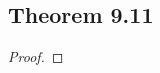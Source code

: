 \documentclass[../../main.tex]{subfiles}
\begin{document}
\subsection{Theorem 9.11}
\begin{wts}

\end{wts}
\begin{proof}

\end{proof}
\end{document}
